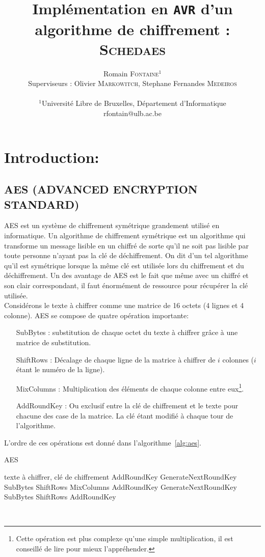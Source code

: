 \documentclass[letterpaper]{article}
\author{Romain \textsc{Fontaine}$^{1}$\\
    Superviseurs : Olivier \textsc{Markowitch}, Stephane Fernandes \textsc{Medeiros}\\
    \mbox{}\\
    $^1$Université Libre de Bruxelles, Département d’Informatique \\
    rfontain@ulb.ac.be
}
\title{Implémentation en \texttt{AVR} d'un algorithme de chiffrement :\\ \textsc{Schedaes}}
\date{}
\begin{document}
\maketitle

\section{Introduction:}
\subsection{AES (ADVANCED ENCRYPTION STANDARD)}
AES est un système de chiffrement symétrique grandement utilisé en informatique.
Un algorithme de chiffrement symétrique est un algorithme qui transforme un message lisible en un chiffré de sorte qu'il ne soit pas lisible par toute personne n'ayant pas la clé de déchiffrement.
On dit d'un tel algorithme qu'il est symétrique lorsque la même clé est utilisée lors du chiffrement et du déchiffrement. Un des avantage de AES est le fait que même avec un chiffré et son clair correspondant, il faut énormément de ressource pour récupérer la clé utilisée.\\

Considérons le texte à chiffrer comme une matrice de 16 octets (4 lignes et 4 colonne).
AES se compose de quatre opération importante:\\
\begin{itemize}
    \item[SubBytes :] substitution de chaque octet du texte à chiffrer grâce à une matrice de substitution.
    \item[ShiftRows :] Décalage de chaque ligne de la matrice à chiffrer de $i$ colonnes ($i$ étant le numéro de la ligne).
    \item[MixColumns :] Multiplication des éléments de chaque colonne entre eux\footnote{Cette opération est plus complexe qu'une simple multiplication, il est conseillé de lire \cite{fips197} pour mieux l'appréhender.}.
    \item[AddRoundKey :] Ou exclusif entre la clé de chiffrement et le texte pour chacune des case de la matrice. La clé étant modifié à chaque tour de l'algorithme.
\end{itemize}

L'ordre de ces opérations est donné dans l'algorithme~\ref{alg:aes}.
\begin{algorithm}
    \caption{AES}
    \label{alg:aes}
    \begin{algorithmic}[1]
        \REQUIRE texte à chiffrer, clé de chiffrement
        \STATE AddRoundKey
        \STATE GenerateNextRoundKey
            \STATE SubBytes
            \STATE ShiftRows
            \STATE MixColumns
            \STATE AddRoundKey
            \STATE GenerateNextRoundKey
        \ENDFOR
        \STATE SubBytes
        \STATE ShiftRows
        \STATE AddRoundKey
    \end{algorithmic}
\end{algorithm}\\
\end{document}
